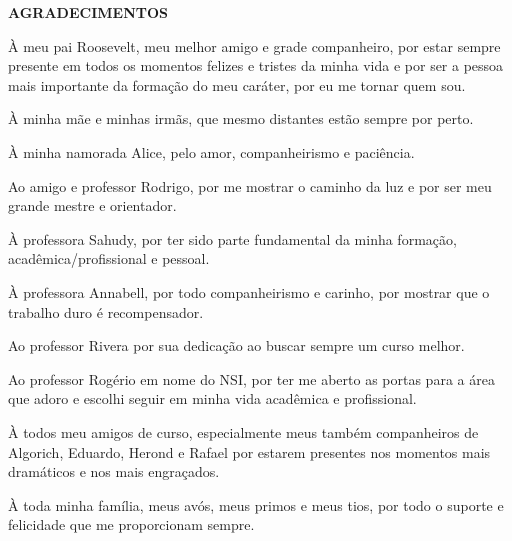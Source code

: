 \begin{center}
\textbf{AGRADECIMENTOS} \\ [2.5cm]
\end{center}

À meu pai Roosevelt, meu melhor amigo e grade companheiro, por estar sempre presente em todos os momentos felizes e tristes da minha vida e por ser a pessoa mais importante da formação do meu caráter, por eu me tornar quem sou.

À minha mãe e minhas irmãs, que mesmo distantes estão sempre por perto.

À minha namorada Alice, pelo amor, companheirismo e paciência.

Ao amigo e professor Rodrigo, por me mostrar o caminho da luz e por ser meu grande mestre e orientador.

À professora Sahudy, por ter sido parte fundamental da minha formação, acadêmica/profissional e pessoal.

À professora Annabell, por todo companheirismo e carinho, por mostrar que o trabalho duro é recompensador.

Ao professor Rivera por sua dedicação ao buscar sempre um curso melhor.

Ao professor Rogério em nome do NSI, por ter me aberto as portas para a área que adoro e escolhi seguir em minha vida acadêmica e profissional.

À todos meu amigos de curso, especialmente meus também companheiros de Algorich, Eduardo, Herond e Rafael por estarem presentes nos momentos mais dramáticos e nos mais engraçados.

À toda minha família, meus avós, meus primos e meus tios, por todo o suporte e felicidade que me proporcionam sempre.